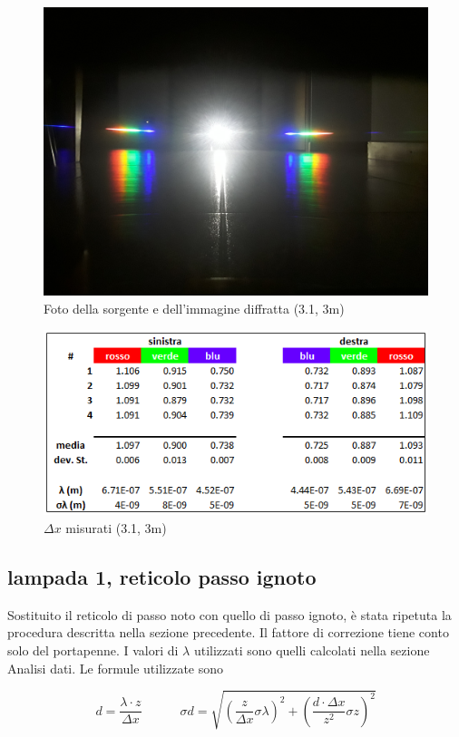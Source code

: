 \documentclass{article}
\begin{document}
\begin{figure}[h!]
  \centering
  \includegraphics[width=0.6\linewidth]{IM 1.1.2}
  \caption{Foto della sorgente e dell'immagine diffratta (3.1, 3m)}
\end{figure}

\begin{figure}[h!]
  \centering
  \includegraphics[width=0.6\linewidth]{IM tab_1.1.2}
  \caption{$\Delta x$ misurati (3.1, 3m)}
\end{figure}

\pagebreak

\subsection{lampada 1, reticolo passo ignoto}

Sostituito il reticolo di passo noto con quello di passo ignoto, è stata ripetuta la procedura descritta nella sezione precedente. Il fattore di correzione tiene conto solo del portapenne. I valori di $\lambda$ utilizzati sono quelli calcolati nella sezione Analisi dati. Le formule utilizzate sono

\[d = \frac{\lambda \cdot z}{\Delta x} \quad \quad \quad \sigma d = \sqrt{\left( \frac{z}{\Delta x} \sigma \lambda \right)^2 + \left( \frac{d \cdot \Delta x}{z^2}\sigma z \right)^2}\]
\end{document}
